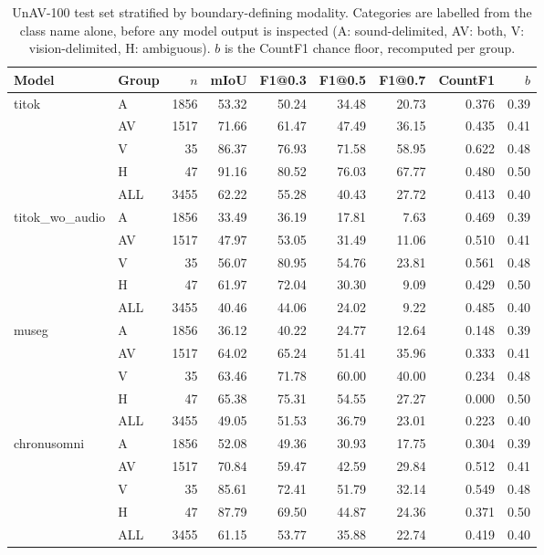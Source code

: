 \begin{table}[t]
\centering\small
\caption{UnAV-100 test set stratified by boundary-defining modality. Categories are labelled from the class name alone, before any model output is inspected (A: sound-delimited, AV: both, V: vision-delimited, H: ambiguous). $b$ is the CountF1 chance floor, recomputed per group.}
\label{tab:modality_breakdown}
\begin{tabular}{llrrrrrrr}
\toprule
Model & Group & $n$ & mIoU & F1@0.3 & F1@0.5 & F1@0.7 & CountF1 & $b$ \\
\midrule
titok & A & 1856 & 53.32 & 50.24 & 34.48 & 20.73 & 0.376 & 0.39 \\
 & AV & 1517 & 71.66 & 61.47 & 47.49 & 36.15 & 0.435 & 0.41 \\
 & V & 35 & 86.37 & 76.93 & 71.58 & 58.95 & 0.622 & 0.48 \\
 & H & 47 & 91.16 & 80.52 & 76.03 & 67.77 & 0.480 & 0.50 \\
 & ALL & 3455 & 62.22 & 55.28 & 40.43 & 27.72 & 0.413 & 0.40 \\
\midrule
titok\_wo\_audio & A & 1856 & 33.49 & 36.19 & 17.81 & 7.63 & 0.469 & 0.39 \\
 & AV & 1517 & 47.97 & 53.05 & 31.49 & 11.06 & 0.510 & 0.41 \\
 & V & 35 & 56.07 & 80.95 & 54.76 & 23.81 & 0.561 & 0.48 \\
 & H & 47 & 61.97 & 72.04 & 30.30 & 9.09 & 0.429 & 0.50 \\
 & ALL & 3455 & 40.46 & 44.06 & 24.02 & 9.22 & 0.485 & 0.40 \\
\midrule
museg & A & 1856 & 36.12 & 40.22 & 24.77 & 12.64 & 0.148 & 0.39 \\
 & AV & 1517 & 64.02 & 65.24 & 51.41 & 35.96 & 0.333 & 0.41 \\
 & V & 35 & 63.46 & 71.78 & 60.00 & 40.00 & 0.234 & 0.48 \\
 & H & 47 & 65.38 & 75.31 & 54.55 & 27.27 & 0.000 & 0.50 \\
 & ALL & 3455 & 49.05 & 51.53 & 36.79 & 23.01 & 0.223 & 0.40 \\
\midrule
chronusomni & A & 1856 & 52.08 & 49.36 & 30.93 & 17.75 & 0.304 & 0.39 \\
 & AV & 1517 & 70.84 & 59.47 & 42.59 & 29.84 & 0.512 & 0.41 \\
 & V & 35 & 85.61 & 72.41 & 51.79 & 32.14 & 0.549 & 0.48 \\
 & H & 47 & 87.79 & 69.50 & 44.87 & 24.36 & 0.371 & 0.50 \\
 & ALL & 3455 & 61.15 & 53.77 & 35.88 & 22.74 & 0.419 & 0.40 \\
\bottomrule
\end{tabular}
\end{table}

